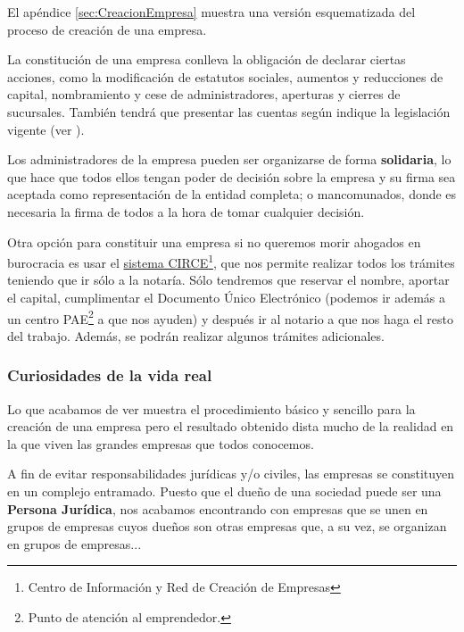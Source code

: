 \documentclass[nochap,palatino,shortheader]{apuntes}
\begin{document}
El apéndice \ref{sec:CreacionEmpresa} muestra una versión esquematizada del proceso de creación de una empresa.

La constitución de una empresa conlleva la obligación de declarar ciertas acciones, como la modificación de estatutos sociales, aumentos y reducciones de capital, nombramiento y cese de administradores, aperturas y cierres de sucursales. También tendrá que presentar las cuentas según indique la legislación vigente (ver ).

Los administradores de la empresa pueden ser organizarse de forma \textbf{solidaria}, lo que hace que todos ellos tengan poder de decisión sobre la empresa y su firma sea aceptada como representación de la entidad completa; o mancomunados, donde es necesaria la firma de todos a la hora de tomar cualquier decisión. %

Otra opción para constituir una empresa si no queremos morir ahogados en burocracia es usar el \href{http://www.creatuempresa.org/es-ES/PasoApaso/Paginas/etramitacion.aspx?cod=SRL&nombre=Sociedad%20de%20Responsabilidad%20Limitada&idioma=es-es}{sistema CIRCE}\footnote{Centro de Información y Red de Creación de Empresas}, que nos permite realizar todos los trámites teniendo que ir sólo a la notaría. Sólo tendremos que reservar el nombre, aportar el capital, cumplimentar el Documento Único Electrónico (podemos ir además a un centro PAE\footnote{Punto de atención al emprendedor.} a que nos ayuden) y después ir al notario a que nos haga el resto del trabajo. Además, se podrán realizar algunos trámites adicionales.

\subsubsection{Curiosidades de la vida real}
Lo que acabamos de ver muestra el procedimiento básico y sencillo para la creación de una empresa pero el resultado obtenido dista mucho de la realidad en la que viven las grandes empresas que todos conocemos.

A fin de evitar responsabilidades jurídicas y/o civiles, las empresas se constituyen en un complejo entramado. Puesto que el dueño de una sociedad puede ser una \textbf{Persona Jurídica}, nos acabamos encontrando con empresas que se unen en grupos de empresas cuyos dueños son otras empresas que, a su vez, se organizan en grupos de empresas...

\end{document}

